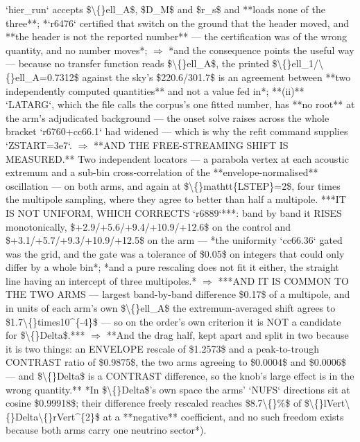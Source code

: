 \begin{description}
`hier\_run` accepts \$\textbackslash\{\}ell\_A\$, \$D\_M\$ and \$r\_s\$ and **loads none of the three**;  *`r6476` certified that switch on the ground that the header moved, and **the header is not the reported number** --- the certification was of the wrong quantity, and no number moves*; \ensuremath{\Rightarrow} *and the consequence points the useful way --- because no transfer function reads \$\textbackslash\{\}ell\_A\$, the printed \$\textbackslash\{\}ell\_1/\textbackslash\{\}ell\_A=0.7312\$ against the sky's \$220.6/301.7\$ is an agreement between **two independently computed quantities** and not a value fed in*; **(ii)** `LATARG`, which the file calls the corpus's one fitted number, has **no root** at the arm's adjudicated background --- the onset solve raises across the whole bracket `r6760+cc66.1` had widened --- which is why the refit command supplies `ZSTART=3e7`. \ensuremath{\Rightarrow}  **AND THE FREE-STREAMING SHIFT IS MEASURED.** Two independent locators --- a parabola vertex at each acoustic extremum and a sub-bin cross-correlation of the **envelope-normalised** oscillation --- on both arms, and again at \$\textbackslash\{\}mathtt\{LSTEP\}=2\$, four times the multipole sampling, where they agree to better than half a multipole.  ***IT IS NOT UNIFORM, WHICH CORRECTS `r6889`***: band by band it RISES monotonically, \$+2.9/+5.6/+9.4/+10.9/+12.6\$ on the control and \$+3.1/+5.7/+9.3/+10.9/+12.5\$ on the arm --- *the uniformity `cc66.36` gated was the grid, and the gate was a tolerance of \$0.05\$ on integers that could only differ by a whole bin*;  *and a pure rescaling does not fit it either, the straight line having an intercept of three multipoles.* \ensuremath{\Rightarrow} ***AND IT IS COMMON TO THE TWO ARMS --- largest band-by-band difference \$0.17\$ of a multipole, and in units of each arm's own \$\textbackslash\{\}ell\_A\$ the extremum-averaged shift agrees to \$1.7\textbackslash\{\}times10\textasciicircum{}\{-4\}\$ --- so on the order's own criterion it is NOT a candidate for \$\textbackslash\{\}Delta\$.*** \ensuremath{\Rightarrow} **And the drag half, kept apart and split in two because it is two things: an ENVELOPE rescale of \$1.2573\$ and a peak-to-trough CONTRAST ratio of \$0.9875\$, the two arms agreeing to \$0.0004\$ and \$0.0006\$ --- and \$\textbackslash\{\}Delta\$ is a CONTRAST difference, so the knob's large effect is in the wrong quantity.**  *In \$\textbackslash\{\}Delta\$'s own space the arms' `NUFS` directions sit at cosine \$0.99918\$; their difference freely rescaled reaches \$8.7\textbackslash\{\}\%\$ of \$\textbackslash\{\}lVert\textbackslash\{\}Delta\textbackslash\{\}rVert\textasciicircum{}\{2\}\$ at a **negative** coefficient, and no such freedom exists because both arms carry one neutrino sector*). 

\end{description}
